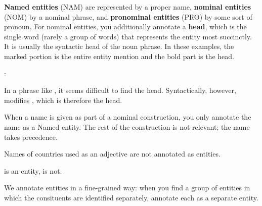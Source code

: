 \textbf{Named entities} (NAM) are represented by a proper name, \textbf{nominal entities} (NOM) by a nominal phrase, and \textbf{pronominal entities} (PRO) by some sort of pronoun. For nominal entities, you additionally annotate a \textbf{head}, which is the single word (rarely a group of words) that represents the entity most succinctly. It is usually the syntactic head of the noun phrase. In these examples, the marked portion is the entire entity mention and the bold part is the head.

\begin{exe}
    \ex {} 
    \expl {}
    
    \ex {} 
    \expl {}  : 
    
    \ex {}
    \expl {} In a phrase like , it seems difficult to find the head. Syntactically, however,  modifies , which is therefore the head.
\end{exe}

When a name is given as part of a nominal construction, you only annotate the name as a Named entity. The rest of the construction is not relevant; the name takes precedence. 

\begin{exe}
    \ex {}
    
    \ex {}
\end{exe}

Names of countries used as an adjective are not annotated as entities.

\begin{exe}
    \ex {}
    \expl {} is an entity,  is not.
\end{exe}

We annotate entities in a fine-grained way: when you find a group of entities in which the consituents are identified separately, annotate each as a separate entity.


